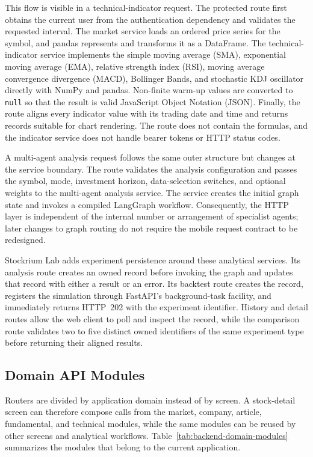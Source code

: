 This flow is visible in a technical-indicator request. The protected route first obtains the current user from the authentication dependency and validates the requested interval. The market service loads an ordered price series for the symbol, and pandas represents and transforms it as a DataFrame. The technical-indicator service implements the simple moving average (SMA), exponential moving average (EMA), relative strength index (RSI), moving average convergence divergence (MACD), Bollinger Bands, and stochastic KDJ oscillator directly with NumPy and pandas. Non-finite warm-up values are converted to \texttt{null} so that the result is valid JavaScript Object Notation (JSON). Finally, the route aligns every indicator value with its trading date and time and returns records suitable for chart rendering. The route does not contain the formulas, and the indicator service does not handle bearer tokens or HTTP status codes.

A multi-agent analysis request follows the same outer structure but changes at the service boundary. The route validates the analysis configuration and passes the symbol, mode, investment horizon, data-selection switches, and optional weights to the multi-agent analysis service. The service creates the initial graph state and invokes a compiled LangGraph workflow. Consequently, the HTTP layer is independent of the internal number or arrangement of specialist agents; later changes to graph routing do not require the mobile request contract to be redesigned.

Stockrium Lab adds experiment persistence around these analytical services. Its analysis route creates an owned record before invoking the graph and updates that record with either a result or an error. Its backtest route creates the record, registers the simulation through FastAPI's background-task facility, and immediately returns HTTP~202 with the experiment identifier. History and detail routes allow the web client to poll and inspect the record, while the comparison route validates two to five distinct owned identifiers of the same experiment type before returning their aligned results.

\subsection{Domain API Modules}
\label{subsec:backend-domain-api-modules}

Routers are divided by application domain instead of by screen. A stock-detail screen can therefore compose calls from the market, company, article, fundamental, and technical modules, while the same modules can be reused by other screens and analytical workflows. Table~\ref{tab:backend-domain-modules} summarizes the modules that belong to the current application.

